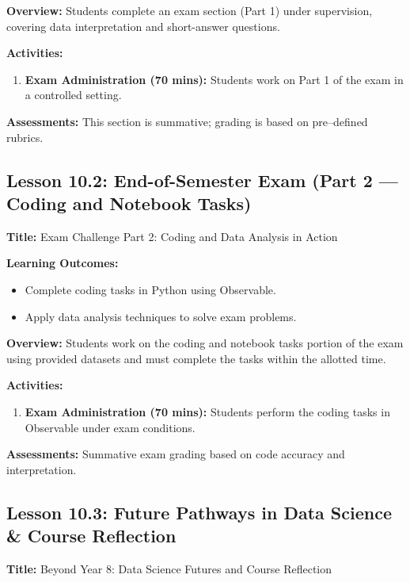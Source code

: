 \documentclass{tufte-book}
\begin{document}
\medskip
\textbf{Overview:}  
Students complete an exam section (Part 1) under supervision, covering data interpretation and short-answer questions.

\medskip
\textbf{Activities:}
\begin{enumerate}[label=\arabic*.]
    \item \textbf{Exam Administration (70 mins):} Students work on Part 1 of the exam in a controlled setting.
\end{enumerate}

\medskip
\textbf{Assessments:}  
This section is summative; grading is based on pre--defined rubrics.

\subsection{Lesson 10.2: End-of-Semester Exam (Part 2 --- Coding and Notebook Tasks)}
\textbf{Title:} Exam Challenge Part 2: Coding and Data Analysis in Action

\medskip
\textbf{Learning Outcomes:}
\begin{itemize}[leftmargin=*, label={\textbullet}]
    \item Complete coding tasks in Python using Observable.
    \item Apply data analysis techniques to solve exam problems.
\end{itemize}

\medskip
\textbf{Overview:}  
Students work on the coding and notebook tasks portion of the exam using provided datasets and must complete the tasks within the allotted time.

\medskip
\textbf{Activities:}
\begin{enumerate}[label=\arabic*.]
    \item \textbf{Exam Administration (70 mins):} Students perform the coding tasks in Observable under exam conditions.
\end{enumerate}

\medskip
\textbf{Assessments:}  
Summative exam grading based on code accuracy and interpretation.

\subsection{Lesson 10.3: Future Pathways in Data Science \& Course Reflection}
\textbf{Title:} Beyond Year 8: Data Science Futures and Course Reflection
\end{document}
